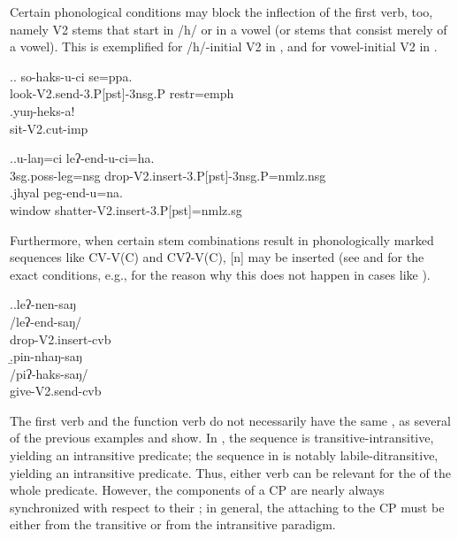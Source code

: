 Certain phonological conditions may block the inflection of the first verb, too, namely V2 stems that start in  /h/ or in a vowel (or stems that consist merely of a vowel). This is exemplified for /h/-initial V2 in \Next, and for vowel-initial V2 in \NNext.

\ex.\ag. so-haks-u-ci se=ppa.\\
look{\sc -V2.send-3.P[pst]-3nsg.P} {\sc restr=emph}\\
 
\bg.yuŋ-heks-a!\\
sit{\sc -V2.cut-imp}\\


\ex.\ag.u-laŋ=ci leʔ-end-u-ci=ha.\\
{\sc 3sg.poss-}leg{\sc =nsg} drop{\sc -V2.insert-3.P[pst]-3nsg.P=nmlz.nsg}\\
\bg.jhyal peg-end-u=na.\\
window shatter{\sc -V2.insert-3.P[pst]=nmlz.sg}\\

Furthermore, when  certain stem combinations result in phonologically marked sequences like CV-V(C) and CVʔ-V(C), [n] may be inserted (see  \Next and   for the exact conditions, e.g., for the reason why this does not happen in cases like \Last[a]).

\ex.\a.\glll leʔ-nen-saŋ\\
/leʔ-end-saŋ/\\
drop{\sc -V2.insert-cvb}\\
\b.\glll pin-nhaŋ-saŋ\\
/piʔ-haks-saŋ/\\
give{\sc -V2.send-cvb}\\


The first verb and the function verb do not necessarily have the same , as several of the previous examples and \Next show. In \Next[a], the sequence is transitive-intransitive, yielding an intransitive predicate; the sequence in \Next[b]  is notably labile-ditransitive, yielding an intransitive predicate. Thus, either  verb can be relevant for the  of the whole predicate. However, the components of a CP are nearly always synchronized with respect to their ; in general, the  attaching to the CP must be either from the transitive or from the intransitive paradigm. 

